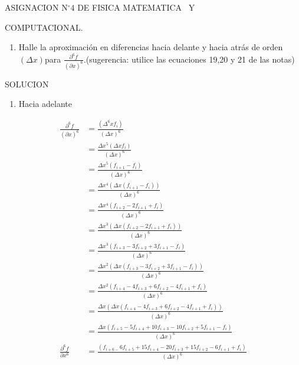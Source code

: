 \documentclass{article}
\begin{document}
\begin{center}
ASIGNACION N$%
{{}^\circ}%
4$ DE FISICA MATEMATICA \ Y

COMPUTACIONAL.
\end{center}

\begin{enumerate}
\item  Halle la aproximaci\'{o}n en diferencias hacia delante y hacia
atr\'{a}s de orden $\left(  \Delta x\right)  $para $\frac{\partial^{6}%
f}{\left(  \partial x\right)  ^{6}}$.(sugerencia: utilice las ecuaciones 19,20
y 21 de las notas)
\end{enumerate}

\bigskip SOLUCION

\begin{enumerate}
\item  Hacia adelante
\end{enumerate}%

\begin{align*}
\frac{\partial^{6}f}{\left(  \partial x\right)  ^{6}}  & =\frac{\left(
\Delta^{6}xf_{i}\right)  }{\left(  \Delta x\right)  ^{6}}\\
& =\frac{\Delta x^{5}\left(  \Delta xf_{i}\right)  }{\left(  \Delta x\right)
^{6}}\\
& =\frac{\Delta x^{5}\left(  f_{i+1}-f_{i}\right)  }{\left(  \Delta x\right)
^{6}}\\
& =\frac{\Delta x^{4}\left(  \Delta x\left(  f_{i+1}-f_{i}\right)  \right)
}{\left(  \Delta x\right)  ^{6}}\\
& =\frac{\Delta x^{4}\left(  f_{i+2}-2f_{i+1}+f_{i}\right)  }{\left(  \Delta
x\right)  ^{6}}\\
& =\frac{\Delta x^{3}\left(  \Delta x\left(  f_{i+2}-2f_{i+1}+f_{i}\right)
\right)  }{\left(  \Delta x\right)  ^{6}}\\
& =\frac{\Delta x^{3}\left(  f_{i+3}-3f_{i+2}+3f_{i+1}-f_{i}\right)  }{\left(
\Delta x\right)  ^{6}}\\
& =\frac{\Delta x^{2}\left(  \Delta x\left(  f_{i+3}-3f_{i+2}+3f_{i+1}%
-f_{i}\right)  \right)  }{\left(  \Delta x\right)  ^{6}}\\
& =\frac{\Delta x^{2}\left(  f_{i+4}-4f_{i+3}+6f_{i+2}-4f_{i+1}+f_{i}\right)
}{\left(  \Delta x\right)  ^{6}}\\
& =\frac{\Delta x\left(  \Delta x\left(  f_{i+4}-4f_{i+3}+6f_{i+2}%
-4f_{i+1}+f_{i}\right)  \right)  }{\left(  \Delta x\right)  ^{6}}\\
& =\frac{\Delta x\left(  f_{i+5}-5f_{i+4}+10f_{i+3}-10f_{i+2}+5f_{i+1}%
-f_{i}\right)  }{\left(  \Delta x\right)  ^{6}}\\
\frac{\partial^{6}f}{\partial x^{6}}  & =\frac{\left(  f_{i+6-}6f_{i+5}%
+15f_{i+4}-20f_{i+3}+15f_{i+2}-6f_{i+1}+f_{i}\right)  }{\left(  \Delta
x\right)  ^{6}}%
\end{align*}
\end{document}
